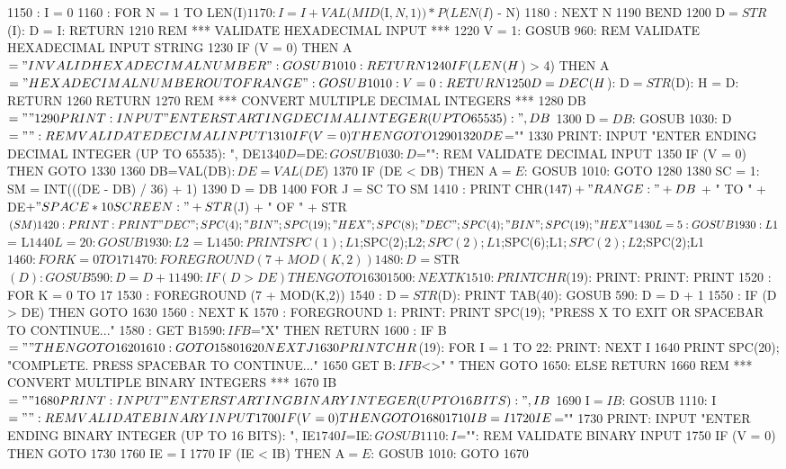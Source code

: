 \begin{screenoutput}
1150 :  I = 0
1160 :  FOR N = 1 TO LEN(I$)
1170 :    I = I + VAL(MID$(I$,N,1)) * P(LEN(I$) - N)
1180 :  NEXT N
1190 BEND
1200 D$ = STR$(I): D = I: RETURN
1210 REM *** VALIDATE HEXADECIMAL INPUT ***
1220 V = 1: GOSUB 960: REM VALIDATE HEXADECIMAL INPUT STRING
1230 IF (V = 0) THEN A$ = "INVALID HEXADECIMAL NUMBER": GOSUB 1010: RETURN
1240 IF (LEN(H$) > 4) THEN A$ = "HEXADECIMAL NUMBER OUT OF RANGE":
GOSUB 1010: V = 0: RETURN
1250 D = DEC(H$): D$ = STR$(D): H = D: RETURN
1260 RETURN
1270 REM *** CONVERT MULTIPLE DECIMAL INTEGERS ***
1280 DB$=""
1290 PRINT: INPUT "ENTER STARTING DECIMAL INTEGER (UP TO 65535): ", DB$
1300 D$=DB$: GOSUB 1030: D$="": REM VALIDATE DECIMAL INPUT
1310 IF (V = 0) THEN GOTO 1290
1320 DE$=""
1330 PRINT: INPUT "ENTER ENDING DECIMAL INTEGER (UP TO 65535): ", DE$
1340 D$=DE$: GOSUB 1030: D$="": REM VALIDATE DECIMAL INPUT
1350 IF (V = 0) THEN GOTO 1330
1360 DB=VAL(DB$): DE=VAL(DE$)
1370 IF (DE < DB) THEN A$ = E$: GOSUB 1010: GOTO 1280
1380 SC = 1: SM = INT(((DE - DB) / 36) + 1)
1390 D = DB
1400 FOR J = SC TO SM
1410 :  PRINT CHR$(147) + "RANGE: " + DB$ + " TO " + DE$ + "{SPACE*10}SCREEN: "
+ STR$(J) + " OF " + STR$(SM)
1420 :  PRINT: PRINT "DEC";SPC(4);"BIN";SPC(19);"HEX";SPC(8);"DEC";SPC(4);
"BIN";SPC(19);"HEX"
1430 L = 5: GOSUB 1930: L1$ = L$
1440 L = 20: GOSUB 1930: L2$ = L$
1450 :    PRINT SPC(1);L1$;SPC(2);L2$;SPC(2);L1$;SPC(6);L1$;SPC(2);
L2$;SPC(2);L1$
1460 :  FOR K = 0 TO 17
1470 :      FOREGROUND (7 + MOD(K,2))
1480 :      D$ = STR$(D): GOSUB 590: D = D + 1
1490 :      IF (D > DE) THEN GOTO 1630
1500 :  NEXT K
1510 :  PRINT CHR$(19): PRINT: PRINT: PRINT
1520 :  FOR K = 0 TO 17
1530 :      FOREGROUND (7 + MOD(K,2))
1540 :      D$ = STR$(D): PRINT TAB(40): GOSUB 590: D = D + 1
1550 :      IF (D > DE) THEN GOTO 1630
1560 :  NEXT K
1570 :  FOREGROUND 1: PRINT: PRINT SPC(19);
"PRESS X TO EXIT OR SPACEBAR TO CONTINUE..."
1580 :  GET B$
1590 :  IF B$="X" THEN RETURN
1600 :  IF B$=" " THEN GOTO 1620
1610 :  GOTO 1580
1620 NEXT J
1630 PRINT CHR$(19): FOR I = 1 TO 22: PRINT: NEXT I
1640 PRINT SPC(20); "COMPLETE. PRESS SPACEBAR TO CONTINUE..."
1650 GET B$: IF B$<>" " THEN GOTO 1650: ELSE RETURN
1660 REM *** CONVERT MULTIPLE BINARY INTEGERS ***
1670 IB$=""
1680 PRINT: INPUT "ENTER STARTING BINARY INTEGER (UP TO 16 BITS): ", IB$
1690 I$=IB$: GOSUB 1110: I$="": REM VALIDATE BINARY INPUT
1700 IF (V = 0) THEN GOTO 1680
1710 IB = I
1720 IE$=""
1730 PRINT: INPUT "ENTER ENDING BINARY INTEGER (UP TO 16 BITS): ", IE$
1740 I$=IE$: GOSUB 1110: I$="": REM VALIDATE BINARY INPUT
1750 IF (V = 0) THEN GOTO 1730
1760 IE = I
1770 IF (IE < IB) THEN A$ = E$: GOSUB 1010: GOTO 1670

\end{screenoutput}
